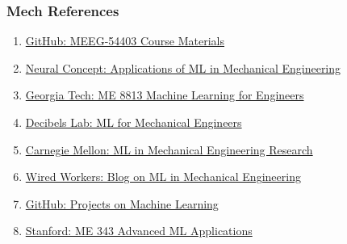 \begin{frame}[fragile]\frametitle{Mech References}
    \begin{enumerate}
        \item \href{https://github.com/hanhuark/MEEG-54403}{GitHub: MEEG-54403 Course Materials}
        \item \href{https://www.neuralconcept.com/post/applications-of-machine-learning-in-mechanical-engineering}{Neural Concept: Applications of ML in Mechanical Engineering}
        \item \href{https://msse.gatech.edu/me8813ML/index.html}{Georgia Tech: ME 8813 Machine Learning for Engineers}
        \item \href{https://lms.decibelslab.com/courses/Machine-Learning-for-Mechanical-Engineers}{Decibels Lab: ML for Mechanical Engineers}
        \item \href{https://www.meche.engineering.cmu.edu/research/machine-learning.html}{Carnegie Mellon: ML in Mechanical Engineering Research}
        \item \href{https://www.wiredworkers.io/blog/machine-learning-in-mechanical-engineering/}{Wired Workers: Blog on ML in Mechanical Engineering}
        \item \href{https://github.com/Parnni/Projects}{GitHub: Projects on Machine Learning}
        \item \href{https://stanford-me343.github.io}{Stanford: ME 343 Advanced ML Applications}
    \end{enumerate}
\end{frame}
